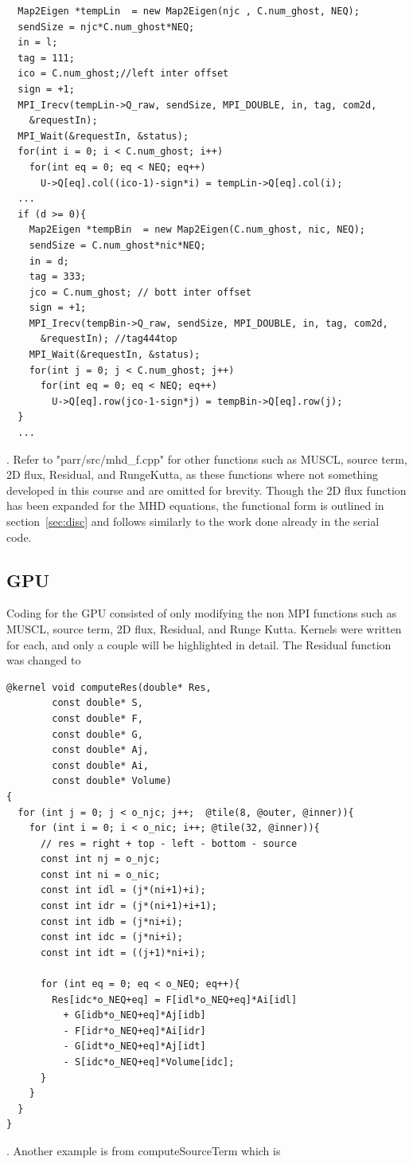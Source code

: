 \documentclass[paper=a4, fontsize=11pt]{scrartcl}
\numberwithin{equation}{section}                %
\numberwithin{figure}{section}                  %
\numberwithin{table}{section}                           %
\begin{document}
\begin{verbatim}
  Map2Eigen *tempLin  = new Map2Eigen(njc , C.num_ghost, NEQ);
  sendSize = njc*C.num_ghost*NEQ;
  in = l;
  tag = 111;
  ico = C.num_ghost;//left inter offset
  sign = +1;
  MPI_Irecv(tempLin->Q_raw, sendSize, MPI_DOUBLE, in, tag, com2d,
    &requestIn);
  MPI_Wait(&requestIn, &status);
  for(int i = 0; i < C.num_ghost; i++)
    for(int eq = 0; eq < NEQ; eq++)
      U->Q[eq].col((ico-1)-sign*i) = tempLin->Q[eq].col(i);
  ...
  if (d >= 0){
    Map2Eigen *tempBin  = new Map2Eigen(C.num_ghost, nic, NEQ);
    sendSize = C.num_ghost*nic*NEQ;
    in = d;
    tag = 333;
    jco = C.num_ghost; // bott inter offset
    sign = +1;
    MPI_Irecv(tempBin->Q_raw, sendSize, MPI_DOUBLE, in, tag, com2d, 
      &requestIn); //tag444top
    MPI_Wait(&requestIn, &status);
    for(int j = 0; j < C.num_ghost; j++)
      for(int eq = 0; eq < NEQ; eq++)
        U->Q[eq].row(jco-1-sign*j) = tempBin->Q[eq].row(j); 
  }
  ...
\end{verbatim}
. Refer to "parr/src/mhd\_f.cpp" for other functions such as MUSCL, source term, 2D flux, Residual, and RungeKutta, as these functions where not something developed in this course and are omitted for brevity. Though the 2D flux function has been expanded for the MHD equations, the functional form is outlined in section~\ref{sec:disc} and follows similarly to the work done already in the serial code.

\subsection{GPU}
Coding for the GPU consisted of only modifying the non MPI functions such as MUSCL, source term, 2D flux, Residual, and Runge Kutta. Kernels were written for each, and only a couple will be highlighted in detail. The Residual function was changed to

\begin{verbatim}
@kernel void computeRes(double* Res,
        const double* S,
        const double* F,
        const double* G,
        const double* Aj,
        const double* Ai,
        const double* Volume)
{
  for (int j = 0; j < o_njc; j++;  @tile(8, @outer, @inner)){
    for (int i = 0; i < o_nic; i++; @tile(32, @inner)){
      // res = right + top - left - bottom - source
      const int nj = o_njc;
      const int ni = o_nic;
      const int idl = (j*(ni+1)+i);
      const int idr = (j*(ni+1)+i+1);
      const int idb = (j*ni+i);
      const int idc = (j*ni+i);
      const int idt = ((j+1)*ni+i);

      for (int eq = 0; eq < o_NEQ; eq++){
        Res[idc*o_NEQ+eq] = F[idl*o_NEQ+eq]*Ai[idl]
          + G[idb*o_NEQ+eq]*Aj[idb]
          - F[idr*o_NEQ+eq]*Ai[idr]
          - G[idt*o_NEQ+eq]*Aj[idt]
          - S[idc*o_NEQ+eq]*Volume[idc];
      }
    }
  }
}
\end{verbatim}
. Another example is from computeSourceTerm which is
\end{document}
